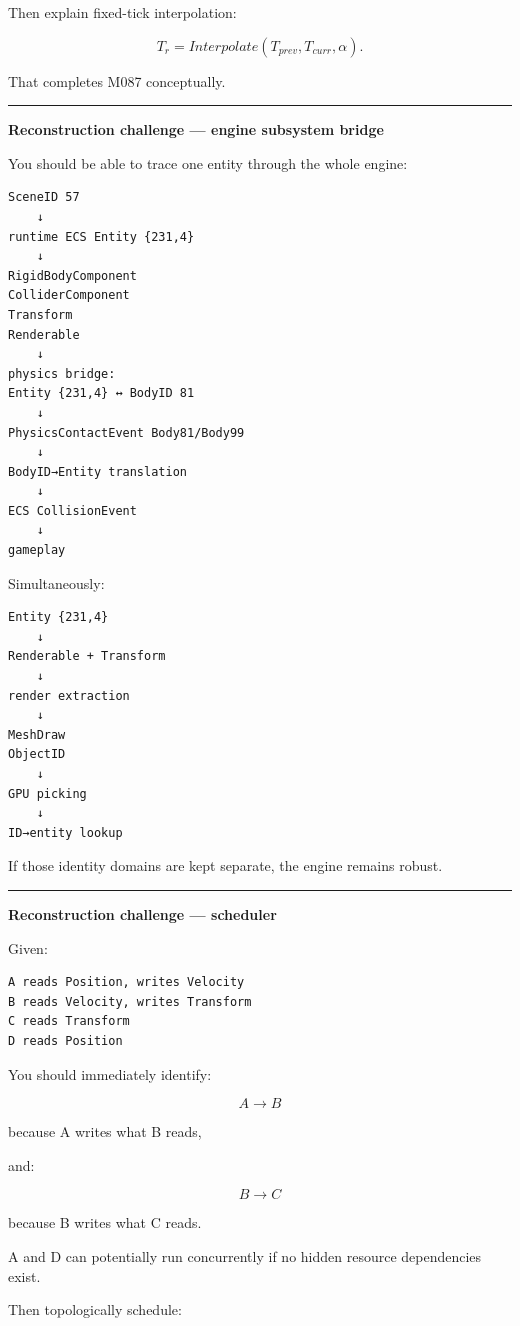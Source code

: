 Then explain fixed-tick interpolation:

\[
T_r=
Interpolate(
T_{prev},
T_{curr},
\alpha).
\]

That completes M087 conceptually.

\begin{center}\rule{0.5\linewidth}{0.5pt}\end{center}

\textbf{Reconstruction challenge --- engine subsystem bridge}

You should be able to trace one entity through the whole engine:

\begin{verbatim}
SceneID 57
    ↓
runtime ECS Entity {231,4}
    ↓
RigidBodyComponent
ColliderComponent
Transform
Renderable
    ↓
physics bridge:
Entity {231,4} ↔ BodyID 81
    ↓
PhysicsContactEvent Body81/Body99
    ↓
BodyID→Entity translation
    ↓
ECS CollisionEvent
    ↓
gameplay
\end{verbatim}

Simultaneously:

\begin{verbatim}
Entity {231,4}
    ↓
Renderable + Transform
    ↓
render extraction
    ↓
MeshDraw
ObjectID
    ↓
GPU picking
    ↓
ID→entity lookup
\end{verbatim}

If those identity domains are kept separate, the engine remains robust.

\begin{center}\rule{0.5\linewidth}{0.5pt}\end{center}

\textbf{Reconstruction challenge --- scheduler}

Given:

\begin{verbatim}
A reads Position, writes Velocity
B reads Velocity, writes Transform
C reads Transform
D reads Position
\end{verbatim}

You should immediately identify:

\[
A\rightarrow B
\]

because A writes what B reads,

and:

\[
B\rightarrow C
\]

because B writes what C reads.

A and D can potentially run concurrently if no hidden resource dependencies exist.

Then topologically schedule:

